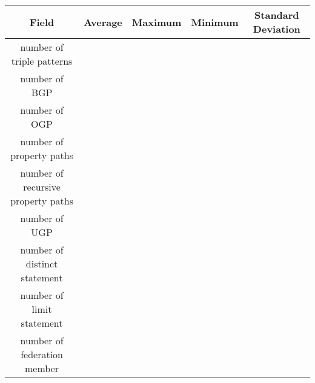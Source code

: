 \begin{center}
    \begin{tabular}{|*{5}{c|}}
     \hline
     Field & Average & Maximum & Minimum & Standard Deviation \\ 
     \hline \hline
     number of triple patterns & {} & {} & {} & {} \\ 
     \hline
     number of BGP & {} & {} & {} & {} \\ 
     \hline
     number of OGP & {} & {} & {} & {} \\ 
     \hline
     number of property paths & {} & {} & {} & {} \\ 
     \hline
     number of recursive property paths & {} & {} & {} & {} \\ 
     \hline
     number of UGP & {} & {} & {} & {} \\ 
     \hline
     number of distinct statement & {} & {} & {} & {} \\ 
     \hline
     number of limit statement & {} & {} & {} & {} \\  
     \hline
     number of federation member & {} & {} & {} & {} \\  
     \hline
    \end{tabular}
\end{center}